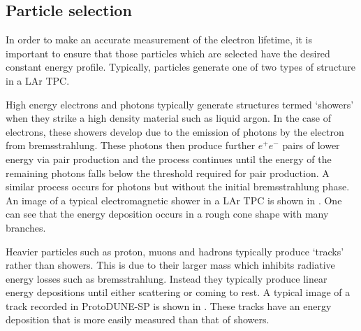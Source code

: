 \subsection{Particle selection}
\label{sec:pdune_calibration:lifetime:selection}

In order to make an accurate measurement of the electron lifetime, it is important to ensure that those particles which are selected have the desired constant energy profile.
Typically, particles generate one of two types of structure in a LAr TPC.

High energy electrons and photons typically generate structures termed `showers' when they strike a high density material such as liquid argon.
In the case of electrons, these showers develop due to the emission of photons by the electron from bremsstrahlung.
These photons then produce further $e^{+}e^{-}$ pairs of lower energy via pair production and the process continues until the energy of the remaining photons falls below the threshold required for pair production.
A similar process occurs for photons but without the initial bremsstrahlung phase.
An image of a typical electromagnetic shower in a LAr TPC is shown in .
One can see that the energy deposition occurs in a rough cone shape with many branches.

Heavier particles such as proton, muons and hadrons typically produce `tracks' rather than showers.
This is due to their larger mass which inhibits radiative energy losses such as bremsstrahlung.
Instead they typically produce linear energy depositions until either scattering or coming to rest.
A typical image of a track recorded in ProtoDUNE-SP is shown in .
These tracks have an energy deposition that is more easily measured than that of showers.

